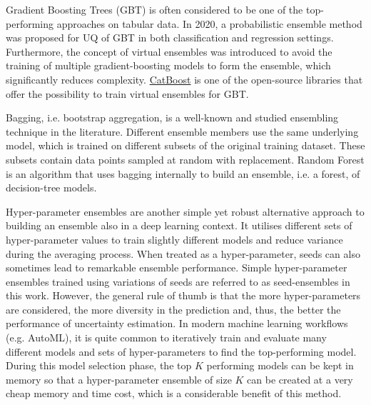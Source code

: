 Gradient Boosting Trees (GBT) is often considered to be one of the top-performing approaches on tabular data. In 2020, a probabilistic ensemble\cite{gradientBoostingEnsembleUQ} method was proposed for UQ of GBT in both classification and regression settings. Furthermore, the concept of virtual ensembles was introduced to avoid the training of multiple gradient-boosting models to form the ensemble, which significantly reduces complexity. \href{catboost.ai/en/docs/references/uncertainty}{CatBoost} is one of the open-source libraries that offer the possibility to train virtual ensembles for GBT.

Bagging, i.e. bootstrap aggregation, is a well-known and studied ensembling technique in the literature. Different ensemble members use the same underlying model, which is trained on different subsets of the original training dataset. These subsets contain data points sampled at random with replacement. %
Random Forest is an algorithm that uses bagging internally to build an ensemble, i.e. a forest, of decision-tree models. 

Hyper-parameter ensembles\cite{hyperparameterEnsembleDL} are another simple yet robust alternative approach to building an ensemble also in a deep learning context. It utilises different sets of hyper-parameter values to train slightly different models and reduce variance during the averaging process. When treated as a hyper-parameter, seeds can also sometimes lead to remarkable ensemble performance. Simple hyper-parameter ensembles trained using variations of seeds are referred to as seed-ensembles in this work. However, the general rule of thumb is that the more hyper-parameters are considered, the more diversity in the prediction and, thus, the better the performance of uncertainty estimation. In modern machine learning workflows (e.g. AutoML), it is quite common to iteratively train and evaluate many different models and sets of hyper-parameters to find the top-performing model. During this model selection phase, the top $K$ performing models can be kept in memory so that a hyper-parameter ensemble of size $K$ can be created at a very cheap memory and time cost, which is a considerable benefit of this method.

